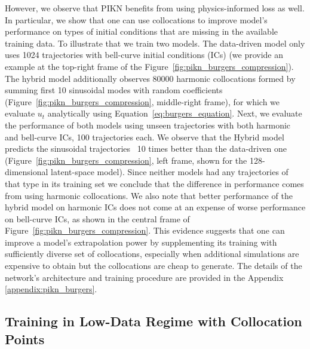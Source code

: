 However, we observe that PIKN benefits from using physics-informed loss as well. In particular, we show that one can use collocations to improve model's performance on types of initial conditions that are missing in the available training data. To illustrate that we train two models. The data-driven model only uses 1024 trajectories with bell-curve initial conditions (ICs) (we provide an example at the top-right frame of the Figure~\ref{fig:pikn_burgers_compression}). The hybrid model additionally observes 80000 harmonic collocations formed by summing first 10 sinusoidal modes with random coefficients (Figure~\ref{fig:pikn_burgers_compression}, middle-right frame), for which we evaluate $u_t$ analytically using Equation~\ref{eq:burgers_equation}. Next, we evaluate the performance of both models using unseen trajectories with both harmonic and bell-curve ICs, 100 trajectories each. We observe that the Hybrid model predicts the sinusoidal trajectories ~10 times better than the data-driven one (Figure~\ref{fig:pikn_burgers_compression}, left frame, shown for the 128-dimensional latent-space model). Since neither models had any trajectories of that type in its training set we conclude that the difference in performance comes from using harmonic collocations. We also note that better performance of the hybrid model on harmonic ICs does not come at an expense of worse performance on bell-curve ICs, as shown in the central frame of Figure~\ref{fig:pikn_burgers_compression}. This evidence suggests that one can improve a model's extrapolation power  by supplementing its training with sufficiently diverse set of collocations, especially when additional simulations are expensive to obtain but the collocations are cheap to generate. The details of the network's architecture and training procedure are provided in the Appendix \ref{appendix:pikn_burgers}.


\subsection{Training in Low-Data Regime with Collocation Points}
\label{sec:data_vs_collocations}

